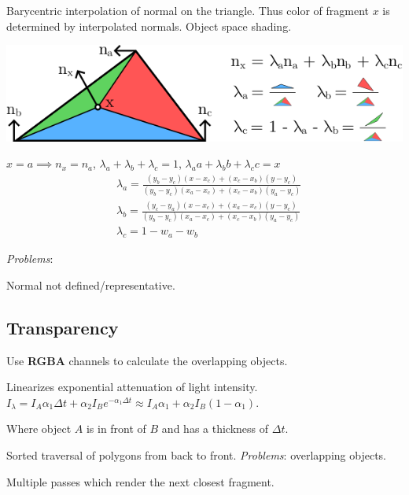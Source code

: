 \begin{algorithm}
  Barycentric interpolation of normal on the triangle. Thus color of fragment \(x\) is determined by interpolated normals.
  Object space shading.

  \includegraphics*[width=\linewidth]{assets/phong-shading.png}

  \(x = a \implies n_x = n_a\), \(\lambda_a + \lambda_b + \lambda_c = 1\), \(\lambda_a a + \lambda_b b + \lambda_c c = x\)
  \[
  \begin{aligned}
  & \lambda_a=\frac{\left(y_b-y_c\right)\left(x-x_c\right)+\left(x_c-x_b\right)\left(y-y_c\right)}{\left(y_b-y_c\right)\left(x_a-x_c\right)+\left(x_c-x_b\right)\left(y_a-y_c\right)} \\
  & \lambda_b=\frac{\left(y_c-y_a\right)\left(x-x_c\right)+\left(x_a-x_c\right)\left(y-y_c\right)}{\left(y_b-y_c\right)\left(x_a-x_c\right)+\left(x_c-x_b\right)\left(y_a-y_c\right)} \\
  & \lambda_c=1-w_a-w_b
  \end{aligned}
  \]


  \textit{Problems}:
  \begin{itemize*}
    \item Normal not defined/representative.
  \end{itemize*}
\end{algorithm}


\subsection{Transparency}

Use \textbf{RGBA} channels to calculate the overlapping objects.

\begin{algorithm}
  Linearizes exponential attenuation of light intensity.
  \(I_\lambda = I_A \alpha_1 \Delta t + \alpha_2 I_Be^{-\alpha_1\Delta t} \approx I_A \alpha_1 + \alpha_2 I_B(1 - \alpha_1)\).

  Where object \(A\) is in front of \(B\) and has a thickness of \(\Delta t\).
\end{algorithm}

\begin{definition}
  Sorted traversal of polygons from back to front.
  \textit{Problems}: overlapping objects.
\end{definition}

\begin{definition}
  Multiple passes which render the next closest fragment.
\end{definition}
